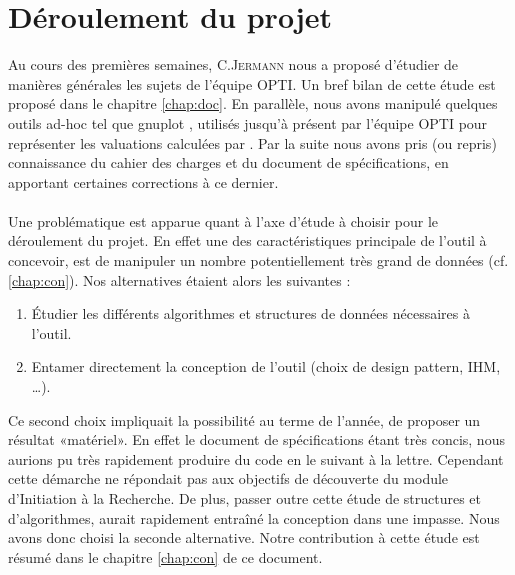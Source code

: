 \section{Déroulement du projet}
Au cours des premières semaines, C.\textsc{Jermann} nous a proposé d'étudier de manières générales les sujets de l'équipe \textsc{OPTI}. Un bref bilan de cette étude est proposé dans le chapitre \ref{chap:doc}. En parallèle, nous avons manipulé quelques outils ad-hoc tel que gnuplot \cite{gnu}, utilisés jusqu'à présent par l'équipe \textsc{OPTI} pour représenter les valuations calculées par \realpaver. Par la suite nous avons pris (ou repris) connaissance du cahier des charges et du document de spécifications, en apportant certaines corrections à ce dernier. 

\paragraph{}Une problématique est apparue quant à l'axe d'étude à choisir pour le déroulement du projet. En effet une des caractéristiques principale de l'outil à concevoir, est de manipuler un nombre potentiellement très grand de données (cf. \ref{chap:con}). Nos alternatives étaient alors les suivantes : 
\begin{enumerate}
\item
Étudier les différents algorithmes et structures de données nécessaires à l'outil.
\item
Entamer directement la conception de l'outil (choix de design pattern, IHM, \dots).
\end{enumerate} 
Ce second choix impliquait la possibilité au terme de l'année, de proposer un résultat «matériel». En effet le document de spécifications étant très concis, nous aurions pu très rapidement produire du code en le suivant à la lettre. Cependant cette démarche ne répondait pas aux objectifs de découverte du module d'Initiation à la Recherche. De plus, passer outre cette étude de structures et d'algorithmes, aurait rapidement entraîné la conception dans une impasse. Nous avons donc choisi la seconde alternative. Notre contribution à cette étude est résumé dans le chapitre \ref{chap:con} de ce document.


